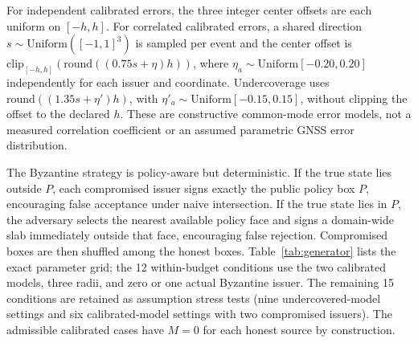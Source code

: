\documentclass[pdflatex,iicol,sn-mathphys-num]{sn-jnl}
\theoremstyle{thmstyleone}
\begin{document}
For independent calibrated errors, the three integer center offsets are each uniform on $[-h,h]$. For correlated calibrated errors, a shared direction $s\sim\mathrm{Uniform}([-1,1]^3)$ is sampled per event and the center offset is $\mathrm{clip}_{[-h,h]}(\mathrm{round}((0.75s+\eta)h))$, where $\eta_a\sim\mathrm{Uniform}[-0.20,0.20]$ independently for each issuer and coordinate. Undercoverage uses $\mathrm{round}((1.35s+\eta')h)$, with $\eta'_a\sim\mathrm{Uniform}[-0.15,0.15]$, without clipping the offset to the declared $h$. These are constructive common-mode error models, not a measured correlation coefficient or an assumed parametric GNSS error distribution.

The Byzantine strategy is policy-aware but deterministic. If the true state lies outside $P$, each compromised issuer signs exactly the public policy box $P$, encouraging false acceptance under naive intersection. If the true state lies in $P$, the adversary selects the nearest available policy face and signs a domain-wide slab immediately outside that face, encouraging false rejection. Compromised boxes are then shuffled among the honest boxes. Table~\ref{tab:generator} lists the exact parameter grid; the 12 within-budget conditions use the two calibrated models, three radii, and zero or one actual Byzantine issuer. The remaining 15 conditions are retained as assumption stress tests (nine undercovered-model settings and six calibrated-model settings with two compromised issuers). The admissible calibrated cases have $M=0$ for each honest source by construction.
\end{document}
